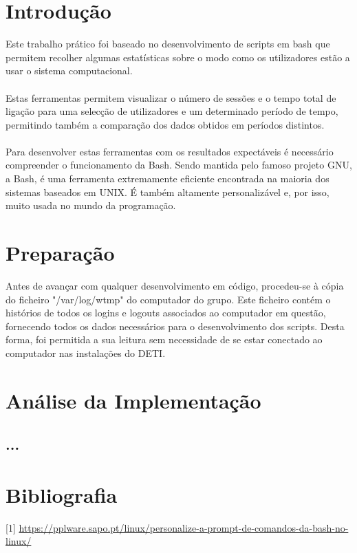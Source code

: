 \documentclass[10pt,portuguese]{article}
\begin{document}
\section{Introdução}
Este trabalho prático foi baseado no desenvolvimento de scripts em bash que permitem recolher algumas estatísticas sobre o modo como os utilizadores estão a usar o sistema computacional. 
\\\\
Estas ferramentas permitem visualizar o número de sessões e o tempo total de ligação para uma selecção de utilizadores e um determinado período de tempo, permitindo também a comparação dos dados obtidos em períodos distintos.
\\\\
Para desenvolver estas ferramentas com os resultados expectáveis é necessário compreender o funcionamento da Bash. Sendo mantida pelo famoso projeto GNU, a Bash, é uma ferramenta extremamente eficiente encontrada na maioria dos sistemas baseados em UNIX. É também altamente personalizável e, por isso, muito usada no mundo da programação.
 

\clearpage

\section{Preparação}
Antes de avançar com qualquer desenvolvimento em código, procedeu-se à cópia do ficheiro "/var/log/wtmp" do computador do grupo. Este ficheiro contém o histórios de todos os logins e logouts associados ao computador em questão, fornecendo todos os dados necessários para o desenvolvimento dos scripts. Desta forma, foi permitida a sua leitura sem necessidade de se estar conectado ao computador nas instalações do DETI. 
\clearpage

\section{Análise da Implementação}
\subsection{...}
\clearpage

\section{Bibliografia}





\vspace{5mm} %

[1] \url{https://pplware.sapo.pt/linux/personalize-a-prompt-de-comandos-da-bash-no-linux/}
\end{document}
